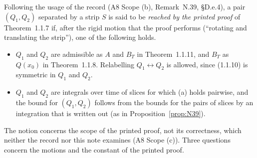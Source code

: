 \documentclass[11pt,a4paper]{article}
\theoremstyle{plain}
\theoremstyle{definition}
\begin{document}
Following the usage of the record (A8 Scope (b), Remark~N.39, \S D.e.4), a pair
$(Q_1,Q_2)$ separated by a strip $S$ is said to be \emph{reached by the printed proof} of
Theorem~1.1.7 if, after the rigid motion that the proof performs (``rotating and translating
the strip''), one of the following holds.
\begin{itemize}
\item[(a)] $Q_1$ and $Q_2$ are admissible as $A$ and $B_T$ in Theorem~1.1.11, and $B_T$ as
$Q(x_0)$ in Theorem~1.1.8.  Relabelling $Q_1\leftrightarrow Q_2$ is allowed, since (1.1.10) is
symmetric in $Q_1$ and $Q_2$.
\item[(b)] $Q_1$ and $Q_2$ are integrals over time of slices for which (a) holds pairwise, and
the bound for $(Q_1,Q_2)$ follows from the bounds for the pairs of slices by an integration that
is written out (as in Proposition~\ref{prop:N39}).
\end{itemize}
The notion concerns the scope of the printed proof, not its correctness, which neither the record
nor this note examines (A8 Scope (c)).  Three questions concern the motions and the constant of
the printed proof.
\end{document}
